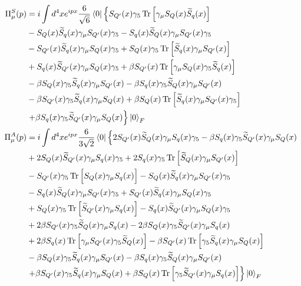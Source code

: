     \begin{align}
        \nonumber\Pi_\mu^S(p) &= i\int d^4xe^{ipx}\dfrac{6}{\sqrt{6}}\bra{0}\left\{S_{{Q'}}(x)\gamma_5\Tr\Big[\gamma_\mu S_{{Q}}(x)\widetilde{S}_{{q}}(x)\Big]\right.\\
        \nonumber&-S_{{Q}}(x)\widetilde{S}_{{q}}(x)\gamma_\mu S_{{Q'}}(x)\gamma_5-S_{{q}}(x)\widetilde{S}_{{Q}}(x)\gamma_\mu S_{{Q'}}(x)\gamma_5\\
        \nonumber&-S_{{Q'}}(x)\widetilde{S}_{{q}}(x)\gamma_\mu S_{{Q}}(x)\gamma_5+S_{{Q}}(x)\gamma_5\Tr\Big[\widetilde{S}_{{q}}(x)\gamma_\mu S_{{Q'}}(x)\Big]\\
        \nonumber&+S_{{q}}(x)\widetilde{S}_{{Q'}}(x)\gamma_\mu S_{{Q}}(x)\gamma_5+\beta S_{{Q'}}(x)\Tr\Big[\gamma_\mu S_{{Q}}(x)\gamma_5\widetilde{S}_{{q}}(x)\Big]\\
        \nonumber&-\beta S_{{Q}}(x)\gamma_5\widetilde{S}_{{q}}(x)\gamma_\mu S_{{Q'}}(x)-\beta S_{{q}}(x)\gamma_5\widetilde{S}_{{Q}}(x)\gamma_\mu S_{{Q'}}(x)\\
        \nonumber&-\beta S_{{Q'}}(x)\gamma_5\widetilde{S}_{{q}}(x)\gamma_\mu S_{{Q}}(x)+\beta S_{{Q}}(x)\Tr\Big[\widetilde{S}_{{q}}(x)\gamma_\mu S_{{Q'}}(x)\gamma_5\Big]\\
        \nonumber&\left.+\beta S_{{q}}(x)\gamma_5\widetilde{S}_{{Q'}}(x)\gamma_\mu S_{{Q}}(x)\right\}\ket{0}_F\\
        \label{transition_after_wick}\Pi_\mu^A(p) &= i\int d^4xe^{ipx}\dfrac{6}{3\sqrt{2}}\bra{0}\left\{2S_{{Q'}}(x)\widetilde{S}_{{Q}}(x)\gamma_{\mu}S_{{q}}(x)\gamma_5-\beta S_{{q}}(x)\gamma_5\widetilde{S}_{{Q'}}(x)\gamma_{\mu}S_{{Q}}(x)\right.\\
        \nonumber&+2S_{{Q}}(x)\widetilde{S}_{{Q'}}(x)\gamma_{\mu}S_{{q}}(x)\gamma_5 +2S_{{q}}(x)\gamma_5\Tr\Big[\widetilde{S}_{{Q}}(x)\gamma_{\mu}S_{{Q'}}(x)\Big]\\
        \nonumber&-S_{{Q'}}(x)\gamma_5\Tr\Big[S_{{Q}}(x)\gamma_{\mu}S_{{q}}(x)\Big] -S_{{Q}}(x)\widetilde{S}_{{q}}(x)\gamma_{\mu}S_{{Q'}}(x)\gamma_5\\
        \nonumber&-S_{{q}}(x)\widetilde{S}_{{Q}}(x)\gamma_{\mu}S_{{Q'}}(x)\gamma_5 +S_{{Q'}}(x)\widetilde{S}_{{q}}(x)\gamma_{\mu}S_{{Q}}(x)\gamma_5\\
        \nonumber&+S_{{Q}}(x)\gamma_5\Tr\Big[\widetilde{S}_{{Q'}}(x)\gamma_{\mu}S_{{q}}(x)\Big] -S_{{q}}(x)\widetilde{S}_{{Q'}}(x)\gamma_{\mu}S_{{Q}}(x)\gamma_5\\
        \nonumber&+2\beta S_{{Q'}}(x)\gamma_5\widetilde{S}_{{Q}}(x)\gamma_{\mu}S_{{q}}(x) -2\beta S_{{Q}}(x)\gamma_5\widetilde{S}_{{Q'}}(x)\gamma_{\mu}S_{{q}}(x)\\
        \nonumber&+2\beta S_{{q}}(x)\Tr\Big[\gamma_{\mu}S_{{Q'}}(x)\gamma_5\widetilde{S}_{{Q}}(x)\Big] -\beta S_{{Q'}}(x)\Tr\Big[\gamma_5\widetilde{S}_{{q}}(x)\gamma_{\mu}S_{{Q}}(x)\Big]\\
        \nonumber&-\beta S_{{Q}}(x)\gamma_5\widetilde{S}_{{q}}(x)\gamma_{\mu}S_{{Q'}}(x) -\beta S_{{q}}(x)\gamma_5\widetilde{S}_{{Q}}(x)\gamma_{\mu}S_{{Q'}}(x)\\
        \nonumber&\left.+\beta S_{{Q'}}(x)\gamma_5\widetilde{S}_{{q}}(x)\gamma_{\mu}S_{{Q}}(x) +\beta S_{{Q}}(x)\Tr\Big[\gamma_5\widetilde{S}_{{Q'}}(x)\gamma_{\mu}S_{{q}}(x)\Big]\right\}\ket{0}_F
    \end{align}

